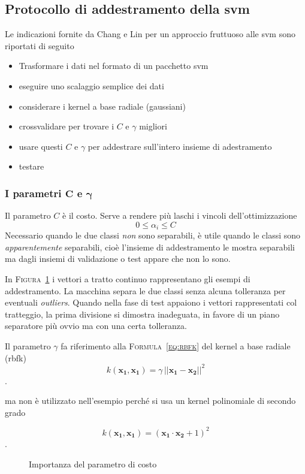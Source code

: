 \subsection {Protocollo di addestramento della \ac{svm}}
Le indicazioni fornite da Chang e Lin
per un approccio fruttuoso alle \ac{svm}
sono riportati di seguito

\begin{itemize}
  \item {Trasformare i dati nel formato di un pacchetto svm}
  \item {eseguire uno scalaggio semplice dei dati}
  \item {considerare i kernel a base radiale (gaussiani)}
  \item {crossvalidare per trovare i $C$ e $\gamma$ migliori}
  \item {usare questi $C$ e $\gamma$ per addestrare sull'intero insieme di adestramento}
  \item {testare}
\end{itemize}

\subsubsection {I parametri $\mathbf{C}$ e $\mathbf{\gamma}$}
Il parametro $C$ \`e il costo.
Serve a rendere pi\`u laschi i vincoli dell'ottimizzazione
\begin{equation}
  \label{eq:vincoliC}
  0 \leq \alpha_i \leq C
\end{equation}
Necessario quando le due classi \emph{non} sono separabili,
\`e utile quando le classi sono \textit{apparentemente} separabili,
cio\`e l'insieme di addestramento le mostra separabili
ma dagli insiemi di validazione o test appare che non lo sono.

In \textsc{Figura~\ref{fig:costo}} i vettori a tratto continuo
rappresentano gli esempi di addestramento.
La macchina separa le due classi senza alcuna tolleranza per eventuali \textit{outliers}.
Quando nella fase di test appaiono i vettori rappresentati col tratteggio,
la prima divisione si dimostra inadeguata,
in favore di un piano separatore più ovvio ma con una certa tolleranza.


Il parametro $\gamma$ fa riferimento alla \textsc{Formula~\ref{eq:rbfk}} del kernel a base radiale (\ac{rbfk})
\begin{equation}
  \label{eq:rbfk}
  k(\boldsymbol{x_1}, \boldsymbol{x_1}) = 
    \gamma\,||\boldsymbol{x_1}-\boldsymbol{x_2}||^2
\end{equation}.

ma non \`e utilizzato nell'esempio
perch\'e si usa  un kernel polinomiale di secondo grado

\begin{equation}
  \label{eq:polyk}
  k(\boldsymbol{x_1}, \boldsymbol{x_1}) = 
    (\boldsymbol{x_1}\cdot\boldsymbol{x_2} +1)^2
\end{equation}.



\begin{figure}
\centering

\caption{Importanza del parametro di costo}
\label{fig:costo}
\end{figure}
